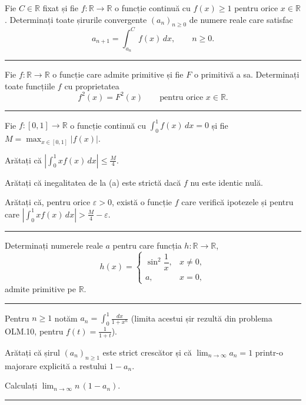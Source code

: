 Fie $C\in\mathbb{R}$ fixat și fie $f:\mathbb{R}\to\mathbb{R}$ o funcție continuă
cu $f(x)\ge1$ pentru orice $x\in\mathbb{R}$. Determinați toate șirurile
convergente $(a_n)_{n\ge0}$ de numere reale care satisfac
\[ a_{n+1}=\int_{a_n}^{C}f(x)\,dx,\qquad n\ge0 . \]
\vspace{1mm}\hrule

Fie $f:\mathbb{R}\to\mathbb{R}$ o funcție care admite primitive și fie $F$ o
primitivă a sa. Determinați toate funcțiile $f$ cu proprietatea
\[ f^2(x)=F^2(x)\qquad\text{pentru orice }x\in\mathbb{R}. \]
\vspace{1mm}\hrule

Fie $f:[0,1]\to\mathbb{R}$ o funcție continuă cu $\displaystyle\int_0^1 f(x)\,dx = 0$
și fie $M=\max_{x\in[0,1]}|f(x)|$.
\begin{parti}
  \item Arătați că $\displaystyle\left|\int_0^1 x f(x)\,dx\right| \le \frac{M}{4}$.
  \item Arătați că inegalitatea de la (a) este strictă dacă $f$ nu este identic nulă.
  \item Arătați că, pentru orice $\varepsilon>0$, există o funcție $f$ care verifică
        ipotezele și pentru care
        $\displaystyle\left|\int_0^1 x f(x)\,dx\right| > \frac{M}{4}-\varepsilon$.
\end{parti}
\vspace{1mm}\hrule

Determinați numerele reale $a$ pentru care funcția $h:\mathbb{R}\to\mathbb{R}$,
\[ h(x)=\begin{cases}\sin^2\dfrac1x, & x\neq 0,\\[4pt] a, & x=0,\end{cases} \]
admite primitive pe $\mathbb{R}$.
\vspace{1mm}\hrule

Pentru $n\ge 1$ notăm $\displaystyle a_n = \int_0^1 \frac{dx}{1+x^n}$ (limita acestui șir rezultă din problema OLM.10, pentru $f(t)=\frac{1}{1+t}$).
\begin{parti}
  \item Arătați că șirul $(a_n)_{n\ge1}$ este strict crescător și că
        $\lim_{n\to\infty}a_n = 1$ printr-o majorare explicită a restului
        $1-a_n$.
  \item Calculați $\displaystyle\lim_{n\to\infty} n\,(1-a_n)$.
\end{parti}
\vspace{1mm}\hrule

